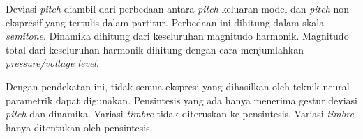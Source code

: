 Deviasi \textit{pitch} diambil dari perbedaan antara \textit{pitch} keluaran model dan \textit{pitch} non-ekspresif yang tertulis dalam partitur. Perbedaan ini dihitung dalam skala \textit{semitone}. Dinamika dihitung dari keseluruhan magnitudo harmonik. Magnitudo total dari keseluruhan harmonik dihitung dengan cara menjumlahkan \textit{pressure/voltage level}.

Dengan pendekatan ini, tidak semua ekspresi yang dihasilkan oleh teknik neural parametrik dapat digunakan. Pensintesis yang ada hanya menerima gestur deviasi \textit{pitch} dan dinamika. Variasi \textit{timbre} tidak diteruskan ke pensintesis. Variasi \textit{timbre} hanya ditentukan oleh pensintesis.